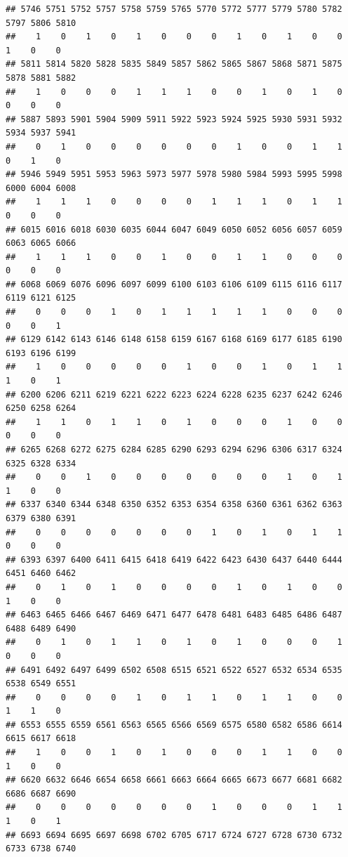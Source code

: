 \documentclass[
]{article}
\begin{document}
\begin{verbatim}
## 5746 5751 5752 5757 5758 5759 5765 5770 5772 5777 5779 5780 5782 5797 5806 5810 
##    1    0    1    0    1    0    0    0    1    0    1    0    0    1    0    0 
## 5811 5814 5820 5828 5835 5849 5857 5862 5865 5867 5868 5871 5875 5878 5881 5882 
##    1    0    0    0    1    1    1    0    0    1    0    1    0    0    0    0 
## 5887 5893 5901 5904 5909 5911 5922 5923 5924 5925 5930 5931 5932 5934 5937 5941 
##    0    1    0    0    0    0    0    0    1    0    0    1    1    0    1    0 
## 5946 5949 5951 5953 5963 5973 5977 5978 5980 5984 5993 5995 5998 6000 6004 6008 
##    1    1    1    0    0    0    0    1    1    1    0    1    1    0    0    0 
## 6015 6016 6018 6030 6035 6044 6047 6049 6050 6052 6056 6057 6059 6063 6065 6066 
##    1    1    1    0    0    1    0    0    1    1    0    0    0    0    0    0 
## 6068 6069 6076 6096 6097 6099 6100 6103 6106 6109 6115 6116 6117 6119 6121 6125 
##    0    0    0    1    0    1    1    1    1    1    0    0    0    0    0    1 
## 6129 6142 6143 6146 6148 6158 6159 6167 6168 6169 6177 6185 6190 6193 6196 6199 
##    1    0    0    0    0    0    1    0    0    1    0    1    1    1    0    1 
## 6200 6206 6211 6219 6221 6222 6223 6224 6228 6235 6237 6242 6246 6250 6258 6264 
##    1    1    0    1    1    0    1    0    0    0    1    0    0    0    0    0 
## 6265 6268 6272 6275 6284 6285 6290 6293 6294 6296 6306 6317 6324 6325 6328 6334 
##    0    0    1    0    0    0    0    0    0    0    1    0    1    1    0    0 
## 6337 6340 6344 6348 6350 6352 6353 6354 6358 6360 6361 6362 6363 6379 6380 6391 
##    0    0    0    0    0    0    0    1    0    1    0    1    1    0    0    0 
## 6393 6397 6400 6411 6415 6418 6419 6422 6423 6430 6437 6440 6444 6451 6460 6462 
##    0    1    0    1    0    0    0    0    1    0    1    0    0    1    0    0 
## 6463 6465 6466 6467 6469 6471 6477 6478 6481 6483 6485 6486 6487 6488 6489 6490 
##    0    1    0    1    1    0    1    0    1    0    0    0    1    0    0    0 
## 6491 6492 6497 6499 6502 6508 6515 6521 6522 6527 6532 6534 6535 6538 6549 6551 
##    0    0    0    0    1    0    1    1    0    1    1    0    0    1    1    0 
## 6553 6555 6559 6561 6563 6565 6566 6569 6575 6580 6582 6586 6614 6615 6617 6618 
##    1    0    0    1    0    1    0    0    0    1    1    0    0    1    0    0 
## 6620 6632 6646 6654 6658 6661 6663 6664 6665 6673 6677 6681 6682 6686 6687 6690 
##    0    0    0    0    0    0    0    1    0    0    0    1    1    1    0    1 
## 6693 6694 6695 6697 6698 6702 6705 6717 6724 6727 6728 6730 6732 6733 6738 6740 

\end{verbatim}
\end{document}
